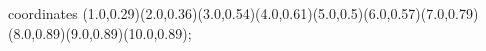 					coordinates { (1.0,0.29)(2.0,0.36)(3.0,0.54)(4.0,0.61)(5.0,0.5)(6.0,0.57)(7.0,0.79)(8.0,0.89)(9.0,0.89)(10.0,0.89)};
